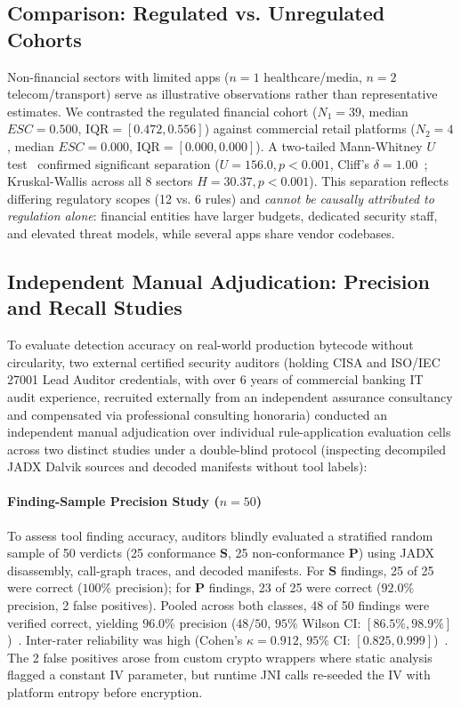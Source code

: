 \subsection{Comparison: Regulated vs. Unregulated Cohorts}
\label{sec:ecosystem:hypothesis}

Non-financial sectors with limited apps ($n=1$ healthcare/media, $n=2$ telecom/transport) serve as illustrative observations rather than representative estimates. We contrasted the regulated financial cohort ($N_1 = 39$, median $ESC = 0.500$, $\text{IQR} = [0.472, 0.556]$) against commercial retail platforms ($N_2 = 4$, median $ESC = 0.000$, $\text{IQR} = [0.000, 0.000]$). A two-tailed Mann-Whitney $U$ test~\cite{mann_whitney_1947} confirmed significant separation ($U = 156.0, p < 0.001$, Cliff's $\delta = 1.00$~\cite{cliff_delta}; Kruskal-Wallis across all 8 sectors $H = 30.37, p < 0.001$). This separation reflects differing regulatory scopes (12 vs. 6 rules) and \textit{cannot be causally attributed to regulation alone}: financial entities have larger budgets, dedicated security staff, and elevated threat models, while several apps share vendor codebases.

\subsection{Independent Manual Adjudication: Precision and Recall Studies}
\label{sec:ecosystem:adjudication}

To evaluate detection accuracy on real-world production bytecode without circularity, two external certified security auditors (holding CISA and ISO/IEC 27001 Lead Auditor credentials, with over 6 years of commercial banking IT audit experience, recruited externally from an independent assurance consultancy and compensated via professional consulting honoraria) conducted an independent manual adjudication over individual rule-application evaluation cells across two distinct studies under a double-blind protocol (inspecting decompiled JADX Dalvik sources and decoded manifests without tool labels):

\paragraph{Finding-Sample Precision Study ($n=50$)} To assess tool finding accuracy, auditors blindly evaluated a stratified random sample of 50 verdicts (25 conformance $\mathbf{S}$, 25 non-conformance $\mathbf{P}$) using JADX disassembly, call-graph traces, and decoded manifests. For $\mathbf{S}$ findings, 25 of 25 were correct ($100\%$ precision); for $\mathbf{P}$ findings, 23 of 25 were correct ($92.0\%$ precision, 2 false positives). Pooled across both classes, 48 of 50 findings were verified correct, yielding $96.0\%$ precision ($48/50$, $95\%$ Wilson CI: $[86.5\%, 98.9\%]$)~\cite{wilson_score_interval}. Inter-rater reliability was high (Cohen's $\kappa = 0.912$, $95\%$ CI: $[0.825, 0.999]$)~\cite{cohen_kappa}. The 2 false positives arose from custom crypto wrappers where static analysis flagged a constant IV parameter, but runtime JNI calls re-seeded the IV with platform entropy before encryption.

